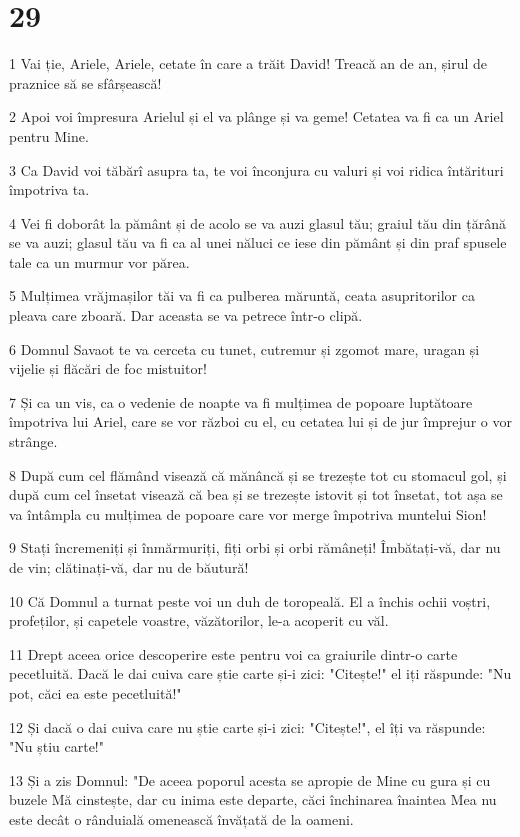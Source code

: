 \chapter{29}

\par 1 Vai ție, Ariele, Ariele, cetate în care a trăit David! Treacă an de an, șirul de praznice să se sfârșească!
\par 2 Apoi voi împresura Arielul și el va plânge și va geme! Cetatea va fi ca un Ariel pentru Mine.
\par 3 Ca David voi tăbărî asupra ta, te voi înconjura cu valuri și voi ridica întărituri împotriva ta.
\par 4 Vei fi doborât la pământ și de acolo se va auzi glasul tău; graiul tău din țărână se va auzi; glasul tău va fi ca al unei năluci ce iese din pământ și din praf spusele tale ca un murmur vor părea.
\par 5 Mulțimea vrăjmașilor tăi va fi ca pulberea măruntă, ceata asupritorilor ca pleava care zboară. Dar aceasta se va petrece într-o clipă.
\par 6 Domnul Savaot te va cerceta cu tunet, cutremur și zgomot mare, uragan și vijelie și flăcări de foc mistuitor!
\par 7 Și ca un vis, ca o vedenie de noapte va fi mulțimea de popoare luptătoare împotriva lui Ariel, care se vor război cu el, cu cetatea lui și de jur împrejur o vor strânge.
\par 8 După cum cel flămând visează că mănâncă și se trezește tot cu stomacul gol, și după cum cel însetat visează că bea și se trezește istovit și tot însetat, tot așa se va întâmpla cu mulțimea de popoare care vor merge împotriva muntelui Sion!
\par 9 Stați încremeniți și înmărmuriți, fiți orbi și orbi rămâneți! Îmbătați-vă, dar nu de vin; clătinați-vă, dar nu de băutură!
\par 10 Că Domnul a turnat peste voi un duh de toropeală. El a închis ochii voștri, profeților, și capetele voastre, văzătorilor, le-a acoperit cu văl.
\par 11 Drept aceea orice descoperire este pentru voi ca graiurile dintr-o carte pecetluită. Dacă le dai cuiva care știe carte și-i zici: "Citește!" el iți răspunde: "Nu pot, căci ea este pecetluită!"
\par 12 Și dacă o dai cuiva care nu știe carte și-i zici: "Citește!", el îți va răspunde: "Nu știu carte!"
\par 13 Și a zis Domnul: "De aceea poporul acesta se apropie de Mine cu gura și cu buzele Mă cinstește, dar cu inima este departe, căci închinarea înaintea Mea nu este decât o rânduială omenească învățată de la oameni.
